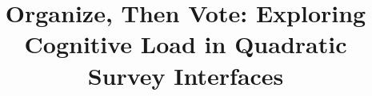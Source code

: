 \documentclass[sigconf]{acmart}
\newcommand{\change}[1]{{\color{black}{#1}}}
\begin{document}

\title{Organize, Then Vote: Exploring Cognitive Load in Quadratic Survey Interfaces}











\renewcommand{\shortauthors}{Ti-Chung Cheng et al.}

\end{document}
